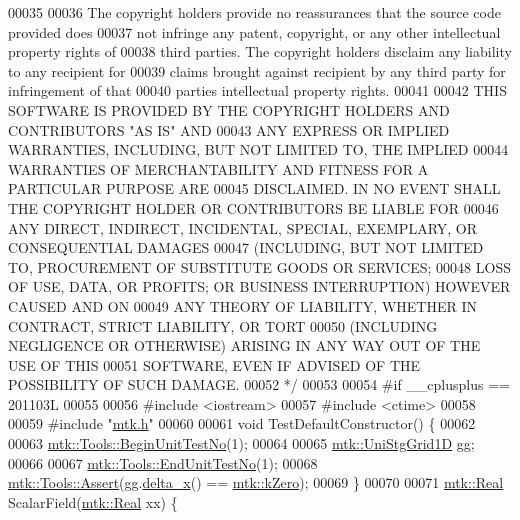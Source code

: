 \begin{DoxyCode}
00035 \textcolor{comment}{}
00036 \textcolor{comment}{The copyright holders provide no reassurances that the source code provided does}
00037 \textcolor{comment}{not infringe any patent, copyright, or any other intellectual property rights of}
00038 \textcolor{comment}{third parties. The copyright holders disclaim any liability to any recipient for}
00039 \textcolor{comment}{claims brought against recipient by any third party for infringement of that}
00040 \textcolor{comment}{parties intellectual property rights.}
00041 \textcolor{comment}{}
00042 \textcolor{comment}{THIS SOFTWARE IS PROVIDED BY THE COPYRIGHT HOLDERS AND CONTRIBUTORS "AS IS" AND}
00043 \textcolor{comment}{ANY EXPRESS OR IMPLIED WARRANTIES, INCLUDING, BUT NOT LIMITED TO, THE IMPLIED}
00044 \textcolor{comment}{WARRANTIES OF MERCHANTABILITY AND FITNESS FOR A PARTICULAR PURPOSE ARE}
00045 \textcolor{comment}{DISCLAIMED. IN NO EVENT SHALL THE COPYRIGHT HOLDER OR CONTRIBUTORS BE LIABLE FOR}
00046 \textcolor{comment}{ANY DIRECT, INDIRECT, INCIDENTAL, SPECIAL, EXEMPLARY, OR CONSEQUENTIAL DAMAGES}
00047 \textcolor{comment}{(INCLUDING, BUT NOT LIMITED TO, PROCUREMENT OF SUBSTITUTE GOODS OR SERVICES;}
00048 \textcolor{comment}{LOSS OF USE, DATA, OR PROFITS; OR BUSINESS INTERRUPTION) HOWEVER CAUSED AND ON}
00049 \textcolor{comment}{ANY THEORY OF LIABILITY, WHETHER IN CONTRACT, STRICT LIABILITY, OR TORT}
00050 \textcolor{comment}{(INCLUDING NEGLIGENCE OR OTHERWISE) ARISING IN ANY WAY OUT OF THE USE OF THIS}
00051 \textcolor{comment}{SOFTWARE, EVEN IF ADVISED OF THE POSSIBILITY OF SUCH DAMAGE.}
00052 \textcolor{comment}{*/}
00053 
00054 \textcolor{preprocessor}{#if \_\_cplusplus == 201103L}
00055 
00056 \textcolor{preprocessor}{#include <iostream>}
00057 \textcolor{preprocessor}{#include <ctime>}
00058 
00059 \textcolor{preprocessor}{#include "\hyperlink{mtk_8h}{mtk.h}"}
00060 
00061 \textcolor{keywordtype}{void} TestDefaultConstructor() \{
00062 
00063   \hyperlink{classmtk_1_1Tools_a26ee906d28523378522a75e25c3a4e19}{mtk::Tools::BeginUnitTestNo}(1);
00064 
00065   \hyperlink{classmtk_1_1UniStgGrid1D}{mtk::UniStgGrid1D} gg;
00066 
00067   \hyperlink{classmtk_1_1Tools_ad8cf0085133dd40c913fe195bc5b9694}{mtk::Tools::EndUnitTestNo}(1);
00068   \hyperlink{classmtk_1_1Tools_aa311fada9255627d06c56b1e4fedce9e}{mtk::Tools::Assert}(gg.\hyperlink{classmtk_1_1UniStgGrid1D_a6e7173b01241632cf509496d66b9f74c}{delta\_x}() == \hyperlink{group__c01-roots_ga59a451a5fae30d59649bcda274fea271}{mtk::kZero});
00069 \}
00070 
00071 \hyperlink{group__c01-roots_gac080bbbf5cbb5502c9f00405f894857d}{mtk::Real} ScalarField(\hyperlink{group__c01-roots_gac080bbbf5cbb5502c9f00405f894857d}{mtk::Real} xx) \{

\end{DoxyCode}
